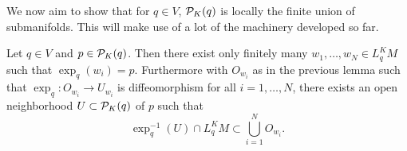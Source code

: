 We now aim to show that for $q\in V$, ${\mathcal{P}}_K(q)$ is locally the finite union of submanifolds. This will make use of a lot of the machinery developed so far. 
\begin{lemma}\label{lem:finitevecs}
    Let $q\in V$ and $p\in {\mathcal{P}}_K(q)$. Then there exist only finitely many $w_1,\dots,w_N\in L^K_qM$ such that $\exp_q(w_i)=p$. Furthermore with $O_{w_i}$ as in the previous lemma such that $\exp_q:O_{w_i}\to U_{w_i}$ is diffeomorphism for all $i=1,\dots,N$, there exists an open neighborhood $U\subset {\mathcal{P}}_K(q)$ of $p$ such that 
    \[
        \exp^{-1}_{q}(U)\cap L^K_qM \subset \bigcup_{i=1}^N O_{w_i}.
    \]
    
\end{lemma}
